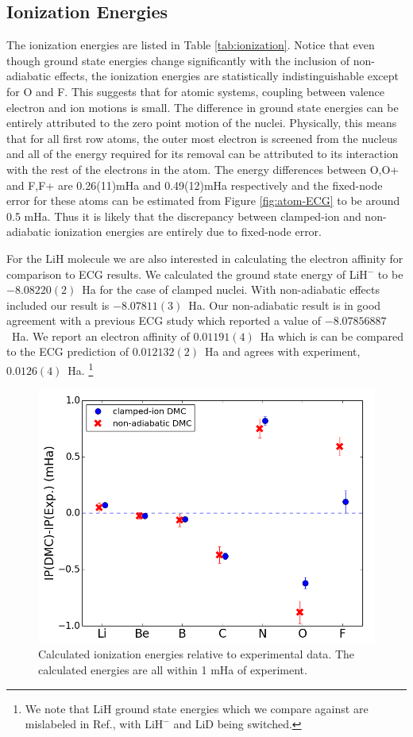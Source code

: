 \documentclass[pra,superscriptaddress,groupedaddress,twocolumn]{revtex4}
\begin{document}
\subsection{Ionization Energies}

The ionization energies are listed in Table \ref{tab:ionization}.  Notice that even though ground state energies change significantly with the inclusion of non-adiabatic effects, the ionization energies are statistically indistinguishable except for O and F. This suggests that for atomic systems, coupling between valence electron and ion motions is small. The difference in ground state energies can be entirely attributed to the zero point motion of the nuclei. Physically, this means that for all first row atoms, the outer most electron is screened from the nucleus and all of the energy required for its removal can be attributed to its interaction with the rest of the electrons in the atom. The energy differences between O,O+ and F,F+ are 0.26(11)mHa and 0.49(12)mHa respectively and the fixed-node error for these atoms can be estimated from Figure \ref{fig:atom-ECG} to be around 0.5 mHa. Thus it is likely that the discrepancy between clamped-ion and non-adiabatic ionization energies are entirely due to fixed-node error.

For the LiH molecule we are also interested in calculating the electron affinity for comparison to ECG results. We calculated the ground state energy of LiH$^-$ to be $-8.08220(2)$~Ha for the case of clamped nuclei.  With non-adiabatic effects included our result is  $-8.07811(3)$~Ha. Our non-adiabatic result is in good agreement with a previous ECG study \cite{Bubin_LiH_noBO} which reported a value of $-8.07856887$~Ha. We report an electron affinity of $0.01191(4)$~Ha which is can be compared to the ECG prediction of $0.012132(2)$~Ha and agrees with experiment, $0.0126(4)$~Ha. \footnote{We note that LiH ground state energies which we compare against are mislabeled in Ref.\cite{Bubin_LiH_noBO}, with $\text{LiH}^-$ and LiD being switched.}

\begin{figure}
\centering
\includegraphics[scale=.4]{Figures/ionization}
\caption{Calculated ionization energies relative to experimental data. The calculated energies are all within 1 mHa of experiment.}
\end{figure}
\end{document}

